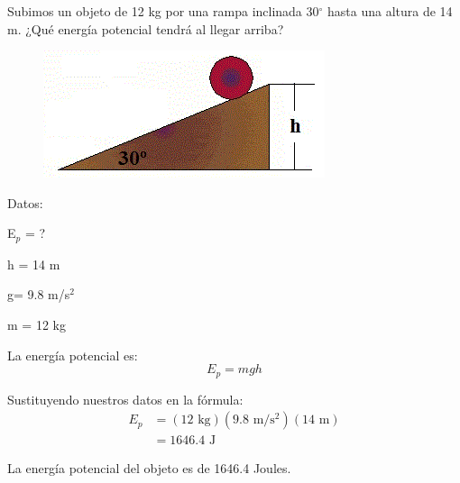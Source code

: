 \question[10] Subimos un objeto de 12 kg por una rampa inclinada 30$^\circ$ hasta una altura de 14 m. ¿Qué energía potencial tendrá al llegar arriba?


\begin{minipage}{0.3\textwidth}
    \begin{figure}[H]
        \includegraphics[width=\linewidth]{../images/ejercicio-energia-potencial-rampa}
    \end{figure}
\end{minipage}\hfill
\begin{minipage}{0.65\textwidth}
    \begin{solutionbox}{5.3cm}
        \begin{multicols}{2}
            Datos:

            E$_p$ = ?

            h = 14 m

            g= 9.8 m/s$^2$

            m = 12 kg

            La energía potencial es:
            \[E_p=mgh\]

            \vspace{2cm}

            Sustituyendo nuestros datos en la fórmula:
            \[
                \begin{array}{rl}
                    E_p & = (12 \text{ kg})(9.8 \text{ m/s$^2$})(14 \text{ m}) \\[1em]
                        & =1646.4 \text{ J }
                \end{array}
            \]

        \end{multicols}
        \begin{center}La energía potencial del objeto es de 1646.4 Joules.\end{center}
    \end{solutionbox}
\end{minipage}